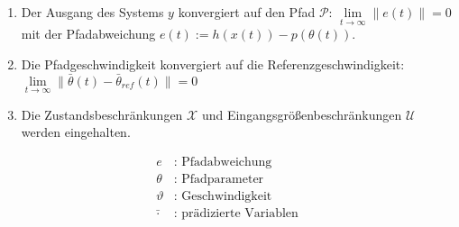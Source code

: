     
    \begin{enumerate}
        \item Der Ausgang des Systems $y$ konvergiert auf den Pfad $\mathcal{P}$: $\lim \limits_{t \to \infty} \|e(t)\| = 0$ mit der Pfadabweichung $e(t) := h(x(t)) - p(\theta(t))$.
        \item Die Pfadgeschwindigkeit konvergiert auf die Referenzgeschwindigkeit: $\lim \limits_{t \to \infty} \|\bar{\theta}(t)-\bar{\theta}_{ref}(t)\| = 0$
        \item Die Zustandsbeschränkungen $\mathcal{X}$ und Eingangsgrößenbeschränkungen $\mathcal{U}$ werden eingehalten.
    \end{enumerate} 







    \begin{align}
        e &\text{: Pfadabweichung}\\
        \theta &\text{: Pfadparameter}\\
        \vartheta &\text{: Geschwindigkeit}\\
        \bar{\cdot} &\text{: prädizierte Variablen}\\
    \end{align}




